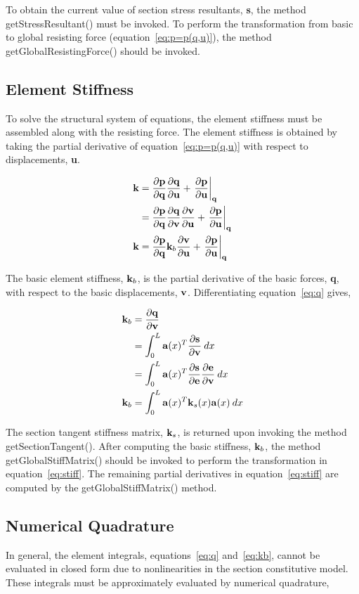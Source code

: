 \documentclass[12pt]{article}
\begin{document}
To obtain the current value of section stress resultants, {\bf s}, the method
getStressResultant() must be invoked. To perform the transformation from
basic to global resisting force (equation~\ref{eq:p=p(q,u)}), the method
getGlobalResistingForce() should be invoked.

\subsection{Element Stiffness}
To solve the structural system of equations, the element stiffness must be assembled
along with the resisting force. The element stiffness is obtained by taking the
partial derivative of equation~\ref{eq:p=p(q,u)} with respect to displacements,
{\bf u}.

\begin{align}
{\bf k} &= \frac{\partial{\bf p}}{\partial{\bf q}}\frac{\partial{\bf q}}{\partial{\bf u}} + \left.\frac{\partial{\bf p}}{\partial{\bf u}}\right|_{\bf q} \\
&= \frac{\partial{\bf p}}{\partial{\bf q}} \frac{\partial{\bf q}}{\partial{\bf v}} \frac{\partial{\bf v}}{\partial{\bf u}} +
\left.\frac{\partial{\bf p}}{\partial{\bf u}}\right|_{\bf q} \\
{\bf k} &= \label{eq:stiff} \frac{\partial{\bf p}}{\partial{\bf q}} {\bf k}_b \frac{\partial{\bf v}}{\partial{\bf u}} +
\left.\frac{\partial{\bf p}}{\partial{\bf u}}\right|_{\bf q}
\end{align}

\noindent The basic element stiffness, ${\bf k}_b$, is the partial derivative
of the basic forces, {\bf q}, with respect to the basic displacements, ${\bf v}$.
Differentiating equation~\ref{eq:q} gives,

\begin{align}
{\bf k}_b &= \frac{\partial{\bf q}}{\partial{\bf v}} \\
&= \int_0^L {\bf a}(x)^T \frac{\partial{\bf s}}{\partial{\bf v}} \: dx \\
&= \int_0^L {\bf a}(x)^T \frac{\partial{\bf s}}{\partial{\bf e}} \frac{\partial{\bf e}}{\partial{\bf v}} \: dx \\
{\bf k}_b &= \label{eq:kb} \int_0^L {\bf a}(x)^T {\bf k}_s(x) {\bf a}(x) \: dx
\end{align}

The section tangent stiffness matrix, ${\bf k}_s$, is returned upon invoking the
method getSectionTangent(). After computing the basic stiffness, ${\bf k}_b$,
the method getGlobalStiffMatrix() should be invoked to perform the
transformation in equation~\ref{eq:stiff}. The remaining partial derivatives in
equation~\ref{eq:stiff} are computed by the getGlobalStiffMatrix() method.

\subsection{Numerical Quadrature}
In general, the element integrals, equations~\ref{eq:q} and~\ref{eq:kb}, cannot
be evaluated in closed form due to nonlinearities in the section constitutive model.
These integrals must be approximately evaluated by numerical quadrature,
\end{document}
